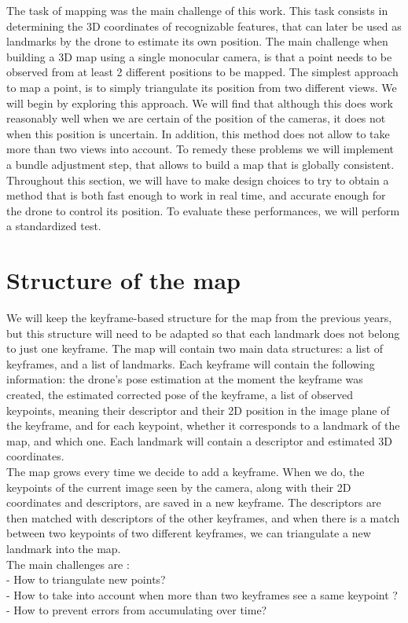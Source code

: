 
The task of mapping was the main challenge of this work. This task consists in determining the 3D coordinates of recognizable features, that can later be used as landmarks by the drone to estimate its own position. The main challenge when building a 3D map using a single monocular camera, is that a point needs to be observed from at least 2 different positions to be mapped. The simplest approach to map a point, is to simply triangulate its position from two different views. We will begin by exploring this approach. We will find that although this does work reasonably well when we are certain of the position of the cameras, it does not when this position is uncertain. In addition, this method does not allow to take more than two views into account. To remedy these problems we will implement a bundle adjustment step, that allows to build a map that is globally consistent. Throughout this section, we will have to make design choices to try to obtain a method that is both fast enough to work in real time, and accurate enough for the drone to control its position. To evaluate these performances, we will perform a standardized test.

\section{Structure of the map}
We will keep the keyframe-based structure for the map from the previous years, but this structure will need to be adapted so that each landmark does not belong to just one keyframe. The map will contain two main data structures: a list of keyframes, and a list of landmarks. Each keyframe will contain the following information: the drone's pose estimation at the moment the keyframe was created, the estimated corrected pose of the keyframe, a list of observed keypoints, meaning their descriptor and their 2D position in the image plane of the keyframe, and for each keypoint, whether it corresponds to a landmark of the map, and which one. Each landmark will contain a descriptor and estimated 3D coordinates.\\
The map grows every time we decide to add a keyframe. When we do, the keypoints of the current image seen by the camera, along with their 2D coordinates and descriptors, are saved in a new keyframe. The descriptors are then matched with descriptors of the other keyframes, and when there is a match between two keypoints of two different keyframes, we can triangulate a new landmark into the map.\\
The main challenges are :\\
- How to triangulate new points?\\
- How to take into account when more than two keyframes see a same keypoint ?\\
- How to prevent errors from accumulating over time?\\


